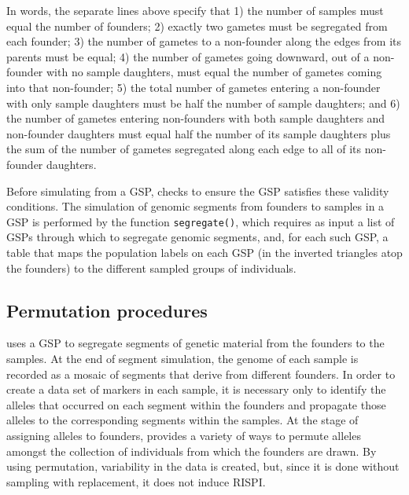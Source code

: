 In words, the separate lines above specify that 1) the number of samples
must equal the number of founders; 2) exactly two gametes must be
segregated from each founder; 3) the number of gametes to a non-founder along the 
edges from its parents must be equal; 
4) the number of gametes going downward, out of a non-founder with no sample
daughters, must equal the number of gametes coming into that non-founder;
5)  the total number of gametes entering a non-founder with only sample daughters
must be half the number of sample daughters; and 6) the number of gametes
entering non-founders with both sample daughters and non-founder daughters must
equal half the number of its sample daughters plus the sum of the number of gametes segregated
along each edge to all of its non-founder daughters.

Before simulating from a GSP, \gscramble{} checks to ensure the GSP
satisfies these validity conditions.  The simulation of genomic segments
from founders to samples in a GSP is performed by the \gscramble{} function
{\footnotesize\tt segregate()}, which requires as input a list of GSPs through which
to segregate genomic segments, and, for each such GSP, a table that maps the
population labels on each GSP (in the inverted triangles atop the founders) to the
different sampled groups of individuals.

\subsection*{Permutation procedures}

\gscramble{} uses a GSP to segregate segments of genetic material from the founders
to the samples.  At the end of segment simulation, the genome of each sample
is recorded as a mosaic of segments that derive from different founders.  In order
to create a data set of markers in each sample, it is necessary only to identify the alleles
that occurred on each segment within the founders and propagate those alleles to the
corresponding segments within the samples.  At the stage of assigning alleles to
founders, \gscramble{} provides a variety of ways to permute alleles amongst
the collection of individuals from which the founders are drawn.  By using permutation,
variability in the data is created, but, since it is done without sampling with replacement, it does
not induce RISPI.

